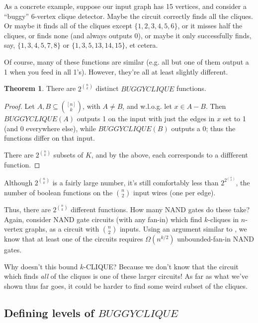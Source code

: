 \documentclass[12pt]{article}
\theoremstyle{definition}
\newtheorem{thm}{Theorem}[section]
\begin{document}
As a concrete example, suppose our input graph has 15 vertices, and
consider a ``buggy'' 6-vertex clique detector.
Maybe the circuit correctly
finds all the cliques. Or maybe it finds all of the cliques except $\{1,2,3,4,5,6\}$,
or it misses half the cliques, or finds none (and always outputs 0), or maybe
it only successfully finds, say, $\{1,3,4,5,7,8\}$ or $\{1,3,5,13,14,15\}$, et cetera.

Of course, many of these functions are similar (e.g. all but one of them
output a 1 when you feed in all 1's). However, they're all at least
slightly different.

\begin{thm}
\label{buggyDistinct}
There are $2^{n \choose k}$ distinct $BUGGYCLIQUE$ functions.
\end{thm}
\begin{proof}

Let $A,B \subseteq {[n] \choose k}$, with $A \neq B$, and w.l.o.g.
let $x \in A-B$. Then $BUGGYCLIQUE(A)$ outputs 1 on the input
with just the edges in $x$ set to 1 (and 0 everywhere else),
while $BUGGYCLIQUE(B)$ outputs a 0; thus the functions differ
on that input.

There are $2^{n \choose k}$ subsets of $K$,
and by the above, each corresponds to a diffferent function.
\end{proof}

Although $2^{n \choose k}$ is a fairly large number,
it's still comfortably less than $2^{2^{n \choose 2}}$, the number of boolean
functions on the ${n \choose 2}$ input wires (one per edge).

Thus, there are $2^{n \choose k}$ different functions. 
How many NAND gates do these take?
Again, consider NAND gate circuits (with any fan-in) which find $k$-cliques in $n$-vertex
graphs, as a circuit with $n \choose 2$ inputs. Using an argument similar to
\cite{shannon_synthesis_1949}, we know that at least one of the circuits requires
$\Omega(n^{k/2})$ unbounded-fan-in NAND gates.

Why doesn't this bound $k$-CLIQUE?
Because we don't know that the circuit which finds {\em all} of the
cliques is one of these larger circuits! As far as what we've
shown thus far goes, it could be harder to find some weird subset of the cliques.

\subsection{Defining levels of $BUGGYCLIQUE$}
\end{document}
